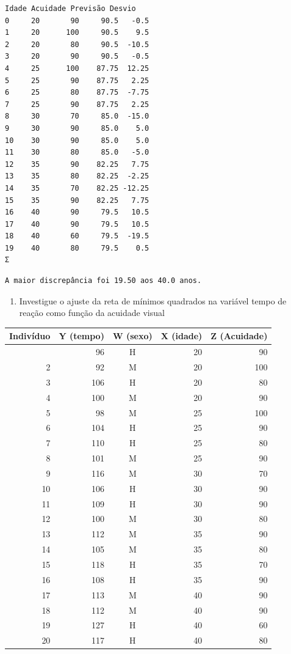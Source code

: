 \documentclass[11pt]{article}
\providecommand{\tightlist}{%
      \setlength{\itemsep}{0pt}\setlength{\parskip}{0pt}}
\begin{document}
    
    \begin{Verbatim}[commandchars=\\\{\}]
   Idade Acuidade Previsão Desvio
0     20       90     90.5   -0.5
1     20      100     90.5    9.5
2     20       80     90.5  -10.5
3     20       90     90.5   -0.5
4     25      100    87.75  12.25
5     25       90    87.75   2.25
6     25       80    87.75  -7.75
7     25       90    87.75   2.25
8     30       70     85.0  -15.0
9     30       90     85.0    5.0
10    30       90     85.0    5.0
11    30       80     85.0   -5.0
12    35       90    82.25   7.75
13    35       80    82.25  -2.25
14    35       70    82.25 -12.25
15    35       90    82.25   7.75
16    40       90     79.5   10.5
17    40       90     79.5   10.5
18    40       60     79.5  -19.5
19    40       80     79.5    0.5
Σ                                
    \end{Verbatim}

    
    \begin{Verbatim}[commandchars=\\\{\}]
A maior discrepância foi 19.50 aos 40.0 anos.
    \end{Verbatim}

    \begin{enumerate}
\def\labelenumi{\alph{enumi})}
\setcounter{enumi}{3}
\tightlist
\item
  Investigue o ajuste da reta de mínimos quadrados na variável tempo de
  reação como função da acuidade visual
\end{enumerate}

{\def\LTcaptype{none} %
\begin{longtable}[]{@{}rrcrr@{}}
\toprule\noalign{}
Indivíduo & Y (tempo) & W (sexo) & X (idade) & Z (Acuidade) \\
\midrule\noalign{}
\endhead
\bottomrule\noalign{}
\endlastfoot
1 & 96 & H & 20 & 90 \\
2 & 92 & M & 20 & 100 \\
3 & 106 & H & 20 & 80 \\
4 & 100 & M & 20 & 90 \\
5 & 98 & M & 25 & 100 \\
6 & 104 & H & 25 & 90 \\
7 & 110 & H & 25 & 80 \\
8 & 101 & M & 25 & 90 \\
9 & 116 & M & 30 & 70 \\
10 & 106 & H & 30 & 90 \\
11 & 109 & H & 30 & 90 \\
12 & 100 & M & 30 & 80 \\
13 & 112 & M & 35 & 90 \\
14 & 105 & M & 35 & 80 \\
15 & 118 & H & 35 & 70 \\
16 & 108 & H & 35 & 90 \\
17 & 113 & M & 40 & 90 \\
18 & 112 & M & 40 & 90 \\
19 & 127 & H & 40 & 60 \\
20 & 117 & H & 40 & 80 \\
\end{longtable}
}
\end{document}
